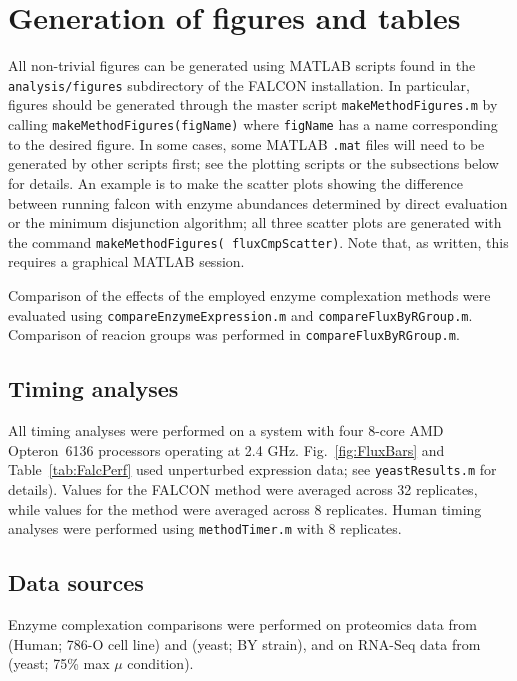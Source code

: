 \section{Generation of figures and tables}

All non-trivial figures can be generated using MATLAB scripts found in
the \texttt{analysis/figures} subdirectory of the FALCON installation.
In particular, figures should be generated through the master script
\texttt{makeMethodFigures.m} by calling
\texttt{makeMethodFigures(figName)} where \texttt{figName} has a name
corresponding to the desired figure.  In some cases, some MATLAB
\texttt{.mat} files will need to be generated by other scripts first;
see the plotting scripts or the subsections below for details. An
example is to make the scatter plots showing the difference between
running falcon with enzyme abundances determined by direct evaluation
or the minimum disjunction algorithm; all three scatter plots are
generated with the command \texttt{makeMethodFigures(\textquotesingle
fluxCmpScatter\textquotesingle)}. Note that, as written, this requires
a graphical MATLAB session.

\begin{sloppypar}
Comparison of the effects of the employed enzyme complexation methods
were evaluated using \texttt{compareEnzymeExpression.m} and 
\texttt{compareFluxByRGroup.m}. Comparison of reacion groups was
performed in \texttt{compareFluxByRGroup.m}.
\end{sloppypar}

\subsection{Timing analyses}
All timing analyses were performed on a system with four 8-core AMD
Opteron\texttrademark\ 6136 processors operating at 2.4 GHz. 
Fig.~\ref{fig:FluxBars} and Table~\ref{tab:FalcPerf} used unperturbed
expression data; see
\texttt{yeastResults.m} for details). Values for the FALCON method
were averaged across 32 replicates, while values for the
\citealt{Lee2012} method were averaged across 8 replicates. Human
timing analyses were performed using \texttt{methodTimer.m} with
8 replicates.

\subsection{Data sources}
Enzyme complexation comparisons were performed on proteomics data
from \citealt{Gholami2013} (Human; 786-O cell line) and 
\citealt{Picotti2013} (yeast; BY strain), and on RNA-Seq data
from \citealt{Lee2012} (yeast; 75\% max $\mu$ condition).